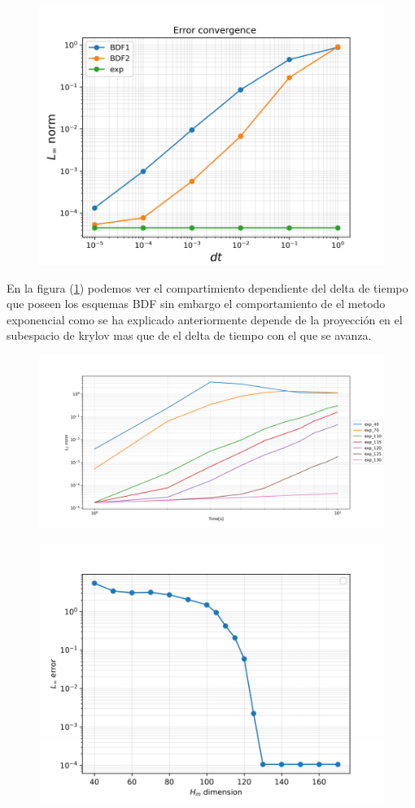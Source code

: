 \documentclass[11pt, spanish]{article}
\begin{document}
\begin{figure}[H]
	\centering
	\includegraphics[width=0.7\linewidth]{res/homogeneo/dt-L2.pdf}
	\caption{}
	\label{fig:delta H}
\end{figure}

En la figura (\ref{fig:delta H}) podemos ver el compartimiento dependiente del delta de tiempo que poseen los esquemas BDF sin embargo el comportamiento de el metodo exponencial como se ha explicado anteriormente depende de la proyecci\'on en el subespacio de krylov mas que de el delta de tiempo con el que se avanza. 

\begin{figure}[H]
	\centering
	\includegraphics[width=0.7\linewidth]{res/homogeneo/L2norm_H_dim_dt_1.0.pdf}
	\caption{}
	\label{fig:H_dim h}
\end{figure}

\begin{figure}[H]
	\centering
	\includegraphics[width=0.7\linewidth]{res/homogeneo/H_dim.pdf}
	\caption{}
	\label{fig:dim h}
\end{figure}
\end{document}
